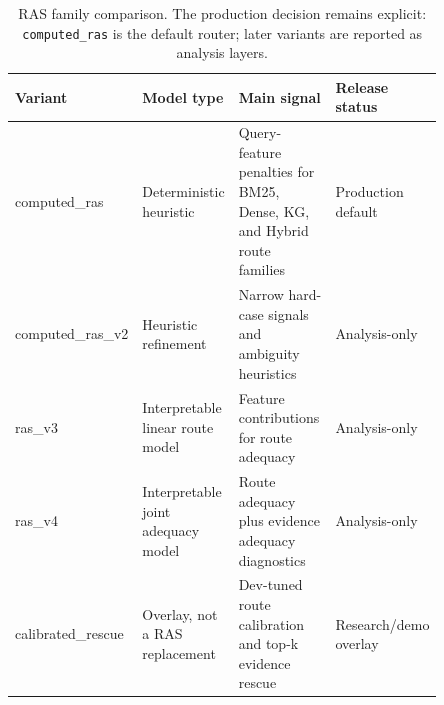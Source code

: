 \begin{table}[t]
\centering
\small
\begin{tabular}{p{0.17\linewidth}p{0.22\linewidth}p{0.28\linewidth}p{0.18\linewidth}}
\toprule
\textbf{Variant} & \textbf{Model type} & \textbf{Main signal} & \textbf{Release status} \\
\midrule
computed\_ras & Deterministic heuristic & Query-feature penalties for BM25, Dense, KG, and Hybrid route families & Production default \\
computed\_ras\_v2 & Heuristic refinement & Narrow hard-case signals and ambiguity heuristics & Analysis-only \\
ras\_v3 & Interpretable linear route model & Feature contributions for route adequacy & Analysis-only \\
ras\_v4 & Interpretable joint adequacy model & Route adequacy plus evidence adequacy diagnostics & Analysis-only \\
calibrated\_rescue & Overlay, not a RAS replacement & Dev-tuned route calibration and top-k evidence rescue & Research/demo overlay \\
\bottomrule
\end{tabular}
\caption{RAS family comparison. The production decision remains explicit: \texttt{computed\_ras} is the default router; later variants are reported as analysis layers.}
\label{tab:rasversions}
\end{table}
